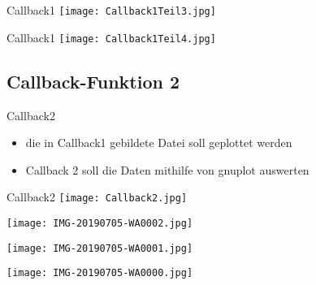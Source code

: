 \documentclass{beamer}
\begin{document}
\begin{frame}{Callback1}
\texttt{[image: Callback1Teil3.jpg]} 
\end{frame}

\begin{frame}{Callback1}
\texttt{[image: Callback1Teil4.jpg]} 
\end{frame}

\subsection{Callback-Funktion 2}
\begin{frame}{Callback2}
\begin{itemize}
\item die in Callback1 gebildete Datei soll geplottet werden
\item Callback 2 soll die Daten mithilfe von gnuplot auswerten
\end{itemize}
\end{frame}

\begin{frame}{Callback2}
\texttt{[image: Callback2.jpg]} 
\end{frame}

\begin{frame}
\texttt{[image: IMG-20190705-WA0002.jpg]} 
\end{frame}

\begin{frame}
\texttt{[image: IMG-20190705-WA0001.jpg]} 
\end{frame}

\begin{frame}
\texttt{[image: IMG-20190705-WA0000.jpg]} 
\end{frame}
\end{document}
